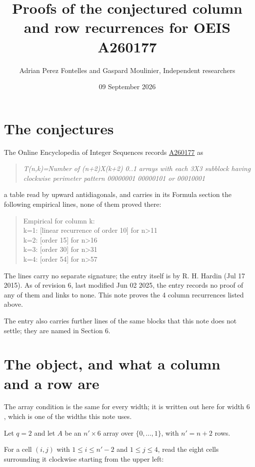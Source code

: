 \documentclass[11pt]{article}
\title{Proofs of the conjectured column and row recurrences for OEIS A260177}
\author{Adrian Perez Fontelles and Gaspard Moulinier, Independent researchers}
\date{09 September 2026}
\theoremstyle{definition}
\begin{document}
\maketitle
\section{The conjectures}

The Online Encyclopedia of Integer Sequences records \href{https://oeis.org/A260177}{A260177} as

\begin{quote}\itshape T(n,k)=Number of (n+2)X(k+2) 0..1 arrays with each 3X3 subblock having clockwise perimeter pattern 00000001 00000101 or 00010001\end{quote}

a table read by upward antidiagonals, and carries in its Formula section the following empirical lines, none of them proved there:

\begin{quote}\ttfamily Empirical for column k:\\
k=1: [linear recurrence of order 10] for n>11\\k=2: [order 15] for n>16\\k=3: [order 30] for n>31\\k=4: [order 54] for n>57\end{quote}

The lines carry no separate signature; the entry itself is by R. H. Hardin (Jul 17 2015). As of revision 6, last modified Jun 02 2025, the entry records no proof of any of them and links to none. This note proves the 4 column recurrences listed above.

The entry also carries further lines of the same blocks that this note does not settle; they are named in Section 6.

\section{The object, and what a column and a row are}

The array condition is the same for every width; it is written out here for width $6$, which is one of the widths this note uses.

Let $q = 2$ and let $A$ be an $n' \times 6$ array over $\{0,\dots,1\}$, with $n' = n + 2$ rows.

For a cell $(i,j)$ with $1 \le i \le n'-2$ and $1 \le j \le 4$, read the eight cells surrounding it clockwise starting from the upper left:
\end{document}
